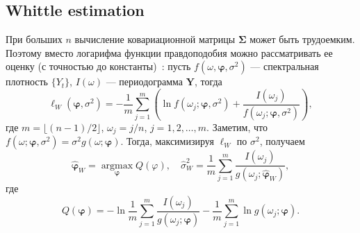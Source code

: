 \documentclass[specialist,
substylefile = spbu_report.rtx,
subf,href,colorlinks=true, 12pt]{disser}
\theoremstyle{definition}
\begin{document}
\subsection{Whittle estimation}
При больших $n$ вычисление ковариационной матрицы $\bm\Sigma$ может быть трудоемким. Поэтому вместо логарифма функции правдоподобия можно рассматривать ее оценку (с точностью до константы)~\cite{Whittle1953}: пусть $f(\omega, \bm\varphi, \sigma^2)$ --- спектральная плотность $\{Y_t\}$, $I(\omega)$ --- периодограмма $\bm Y$, тогда
\[
	\ell_W(\bm\varphi, \sigma^2)=-\frac1m\sum_{j=1}^m\left(\ln f(\omega_j; \bm\varphi, \sigma^2) + \frac{I(\omega_j)}{f(\omega_j; \bm\varphi, \sigma^2)}\right),
\]
где $m=\lfloor(n-1)/2\rfloor$, $\omega_j = j / n$, $j=1,2,\ldots,m$. Заметим, что $f(\omega; \bm\varphi, \sigma^2)=\sigma^2 g(\omega; \bm\varphi)$. Тогда, максимизируя $\ell_W$ по $\sigma^2$, получаем
\[
\widehat{\bm\varphi}_W = \operatorname*{argmax}_{\bm\varphi}Q(\varphi),\quad \widehat\sigma_W^2=\frac1m \sum_{j=1}^m\frac{I(\omega_j)}{g(\omega_j; \widehat{\bm\varphi}_W)},
\]
где
\[
	Q(\bm\varphi)=-\ln\frac1m \sum_{j=1}^m\frac{I(\omega_j)}{g(\omega_j; \bm\varphi)} - \frac1m \sum_{j=1}^m\ln g(\omega_j; \bm\varphi).
\]



\end{document}
